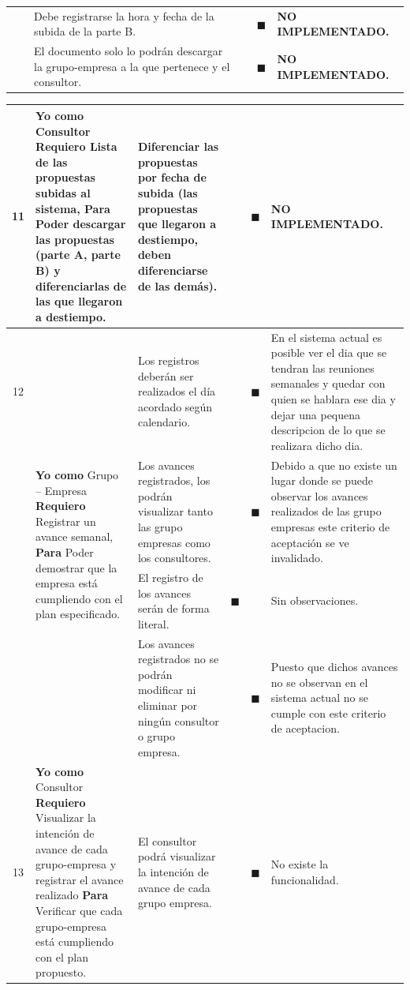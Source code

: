 \documentclass[letterpaper,11pt]{article}
\begin{document}
\begin{landscape}
\begin{tabular}{|c|p{5cm}|p{7.5cm}|c|c|p{7.5cm}|}
				& & Debe registrarse la hora y fecha de la subida de la parte B. & & $\blacksquare$ & \textbf{NO IMPLEMENTADO.} \\ \cline{3-6} 
				& & El documento solo lo podrán descargar la grupo-empresa a la que pertenece y el consultor. & & $\blacksquare$ & \textbf{NO IMPLEMENTADO.} \\ \hline
		\end{tabular}
		\newpage
		\begin{tabular}{|c|p{5cm}|p{7.5cm}|c|c|p{7.5cm}|}
			\hline
			11 & \textbf{Yo como} Consultor \textbf{Requiero} Lista de las propuestas subidas al sistema, \textbf{Para} Poder descargar las propuestas (parte A, parte B) y diferenciarlas de las que llegaron a destiempo. & 	Diferenciar las propuestas por fecha de subida (las propuestas que llegaron a destiempo, deben diferenciarse de las demás). &  & $\blacksquare$ & \textbf{NO IMPLEMENTADO.} \\ \hline
			12 & \multirow{4}{5cm}{\textbf{Yo como} Grupo – Empresa \textbf{Requiero} Registrar un avance semanal, 	\textbf{Para} Poder demostrar que la empresa está cumpliendo con el plan especificado.} & Los registros deberán ser realizados el día acordado
			según calendario. & & $\blacksquare$ & En el sistema actual es posible ver el dia que se tendran las reuniones semanales y quedar con quien se hablara ese dia y dejar una pequena descripcion de lo que se realizara dicho dia. \\ \cline{3-6} 
			& & Los avances registrados, los podrán visualizar tanto las grupo empresas como los consultores. & & $\blacksquare$ & Debido a que no existe un lugar donde se puede observar los avances realizados de las grupo empresas este criterio de aceptación se ve invalidado. \\ \cline{3-6} 
			& & El registro de los avances serán de forma literal. & $\blacksquare$ & & Sin observaciones. \\ \cline{3-6} 
			& & Los avances registrados no se podrán modificar ni eliminar por ningún consultor o grupo empresa. & & $\blacksquare$ & Puesto que dichos avances no se observan en el sistema actual no se cumple con este criterio de aceptacion. \\ \hline
			13 & \multirow{4}{5cm}{\textbf{Yo como} Consultor \textbf{Requiero} Visualizar la intención de avance de cada grupo-empresa y registrar el avance realizado \textbf{Para} Verificar que cada grupo-empresa está cumpliendo con el plan propuesto.} & El consultor podrá visualizar la intención de avance de cada grupo empresa. & & $\blacksquare$ & No existe la funcionalidad. \\ \cline{3-6} 

\end{tabular}
\end{landscape}
\end{document}
